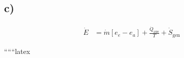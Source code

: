 

\subsection*{c)}

\begin{align*}
\dot{E} &= \dot{m} \left[ e_e - e_a \right] + \frac{\dot{Q}_{\text{aus}}}{T} + \dot{S}_{\text{gen}}
\end{align*}

``````latex